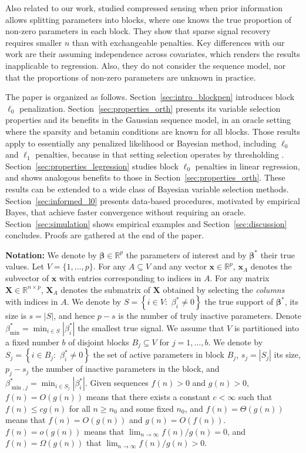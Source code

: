 \documentclass[aos]{imsart}
\theoremstyle{plain}
\newcommand{\R}{\mathbb{R}}
\newcommand{\bs}{\boldsymbol}
\begin{document}
Also related to our work, \cite{scarlett2012compressed} studied compressed sensing when prior information allows splitting parameters into blocks, where one knows the true proportion of non-zero parameters in each block. They show that sparse signal recovery requires smaller $n$ than with exchangeable penalties. Key differences with our work are their assuming independence across covariates, which renders the results inapplicable to regression. Also, they do not consider the sequence model, nor that the proportions of non-zero parameters are unknown in practice.

The paper is organized as follows. Section~\ref{sec:intro_blockpen} introduces block $\ell_0$ penalization. Section~\ref{sec:properties_orth} presents its
variable selection properties and its benefits in the Gaussian sequence model, in an oracle setting where the sparsity and betamin conditions are known for all blocks.
Those results apply to essentially any penalized likelihood or Bayesian method, including $\ell_0$ and $\ell_1$ penalties, because in that setting selection operates by thresholding \cite{davidomiros,rigollethighdimensional}. Section~\ref{sec:properties_legression} studies block $\ell_0$ penalties in linear regression, and shows analogous benefits to those in Section~\ref{sec:properties_orth}. These results can be extended to a wide class of Bayesian variable selection methods. Section~\ref{sec:informed_l0} presents data-based 
procedures, motivated by empirical Bayes, that achieve faster convergence without requiring an oracle. Section~\ref{sec:simulation} shows empirical examples and Section~\ref{sec:discussion} concludes. Proofs are gathered at the end of the paper.
\medskip

\noindent \textbf{Notation:}  
We denote by $\bs \beta\in \R^p$ the parameters of interest 
and by $\bs \beta^*$ their true values. Let  $V=\{1,\ldots,p\}$. For any $A\subseteq V$ and any vector $\bs x\in \R^p$, $\bs x_A$ denotes the subvector of $\bs x$ with entries corresponding to indices in $A$. For any matrix $\bs X \in \R^{n\times p}$, $\bs X_A$ denotes the submatrix of $\bs X$ obtained by selecting the \emph{columns} with indices in $A$. We denote by
$S=\left\{i\in V:\,\,  \beta^*_i \neq 0 \right\}$ the true support of $\bs \beta^*$, its size is $s=|S|$, and hence $p-s$ is the number of truly inactive parameters.
Denote $\beta_{\min}^*=\min_{i \in S}|\beta^*_i|$ the smallest true signal.
We assume that $V$ is partitioned into a fixed number $b$ of disjoint blocks $B_j \subseteq V$ for $j=1,\ldots,b$.
We denote by $S_j=\left\{i\in B_j:\,\,  \beta^*_i \neq 0\right\}$ the set of active parameters in block $B_j$,  $s_j=|S_j|$ its size, $p_j-s_j$ the number of inactive parameters in the block,
and $\beta_{\min,j}^*=\min_{i \in S_j}|\beta^*_i|$.
Given sequences $f(n) > 0$ and $g(n) >0$, $f(n)=O(g(n))$ means that there exists a constant $c<\infty$ such that $f(n) \leq c g(n)$ for all $n \geq n_0$ and some fixed $n_0$, and $f(n)=\Theta(g(n))$ means that $f(n) = O(g(n))$ and $g(n) = O(f(n))$. 
$f(n)=o(g(n))$ means that $\lim_{n\to\infty}f(n) / g(n) = 0$, and $f(n)=\Omega(g(n))$ that $\lim_{n\to\infty}f(n) / g(n) > 0$. 
\medskip
\end{document}
